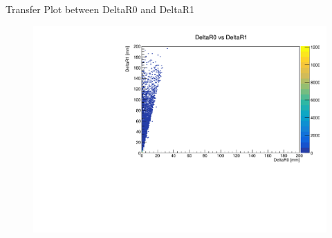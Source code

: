 \begin{frame}{Transfer Plot between DeltaR0 and DeltaR1}
	\begin{figure}
		\includegraphics[width=\linewidth]{output/DeltaR0 vs DeltaR1.pdf}
	\end{figure}
\end{frame}



